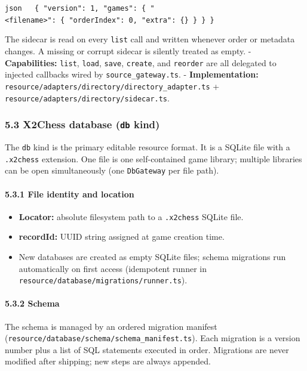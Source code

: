 \documentclass[]{article}
\providecommand{\tightlist}{%
  \setlength{\itemsep}{0pt}\setlength{\parskip}{0pt}}
\let\oldparagraph\paragraph
\renewcommand{\paragraph}[1]{\oldparagraph{#1}\mbox{}}
\begin{document}
\texttt{json\ \ \ \{\ "version":\ 1,\ "games":\ \{\ "\textless{}filename\textgreater{}":\ \{\ "orderIndex":\ 0,\ "extra":\ \{\}\ \}\ \}\ \}}

The sidecar is read on every \texttt{list} call and written whenever
order or metadata changes. A missing or corrupt sidecar is silently
treated as empty. - \textbf{Capabilities:} \texttt{list}, \texttt{load},
\texttt{save}, \texttt{create}, and \texttt{reorder} are all delegated
to injected callbacks wired by \texttt{source\_gateway.ts}. -
\textbf{Implementation:}
\texttt{resource/adapters/directory/directory\_adapter.ts} +
\texttt{resource/adapters/directory/sidecar.ts}.

\subsubsection{\texorpdfstring{5.3 X2Chess database (\texttt{db}
kind)}{5.3 X2Chess database (db kind)}}\label{x2chess-database-db-kind}

The \texttt{db} kind is the primary editable resource format. It is a
SQLite file with a \texttt{.x2chess} extension. One file is one
self-contained game library; multiple libraries can be open
simultaneously (one \texttt{DbGateway} per file path).

\paragraph{5.3.1 File identity and
location}\label{file-identity-and-location}

\begin{itemize}
\tightlist
\item
  \textbf{Locator:} absolute filesystem path to a \texttt{.x2chess}
  SQLite file.
\item
  \textbf{recordId:} UUID string assigned at game creation time.
\item
  New databases are created as empty SQLite files; schema migrations run
  automatically on first access (idempotent runner in
  \texttt{resource/database/migrations/runner.ts}).
\end{itemize}

\paragraph{5.3.2 Schema}\label{schema}

The schema is managed by an ordered migration manifest
(\texttt{resource/database/schema/schema\_manifest.ts}). Each migration
is a version number plus a list of SQL statements executed in order.
Migrations are never modified after shipping; new steps are always
appended.
\end{document}
